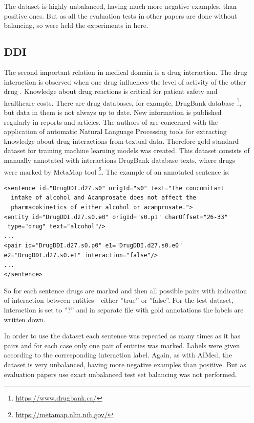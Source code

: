 The dataset is highly unbalanced, having much more negative examples, than positive ones. 
But as all the evaluation tests in other papers are done without balancing, so were held the 
experiments in here.

\subsection{DDI}
The second important relation in medical domain is a drug interaction. The drug interaction is observed 
when one drug influences the level of activity of the other drug \cite{segura20111st}. Knowledge 
about drug 
reactions is critical for patient safety and healthcare costs. There are drug databases, for example, 
DrugBank database \footnote{\url{https://www.drugbank.ca/}}, but data in them is not always up 
to date. 
New information is published regularly in reports and articles. The authors of \cite{segura20111st} are concerned with the application of automatic Natural Language Processing tools for 
extracting knowledge about drug interactions from textual data. Therefore gold standard 
dataset for training machine learning models was created. This dataset 
consists of manually annotated with interactions DrugBank database texts, where drugs were marked by MetaMap 
tool \footnote{\url{https://metamap.nlm.nih.gov/}}. The example of an annotated sentence is:

\begin{verbatim}
<sentence id="DrugDDI.d27.s0" origId="s0" text="The concomitant 
  intake of alcohol and Acamprosate does not affect the 
  pharmacokinetics of either alcohol or acamprosate.">
<entity id="DrugDDI.d27.s0.e0" origId="s0.p1" charOffset="26-33"
 type="drug" text="alcohol"/>
...
<pair id="DrugDDI.d27.s0.p0" e1="DrugDDI.d27.s0.e0" 
e2="DrugDDI.d27.s0.e1" interaction="false"/>
...
</sentence>
\end{verbatim} 

So for each sentence drugs are marked and then all possible pairs with indication of interaction 
between entities - either ''true'' or ''false''. For the test dataset, interaction is set to ''?'' and in separate 
file with gold annotations the labels are written down.

In order to use the dataset each sentence was repeated as many times as it has pairs and for 
each case only one pair of entities was marked. Labels were given according to the 
corresponding interaction label. Again, as with AIMed, the dataset is very unbalanced, having 
more negative examples than positive. But as evaluation papers use exact unbalanced test set 
balancing was not performed.

